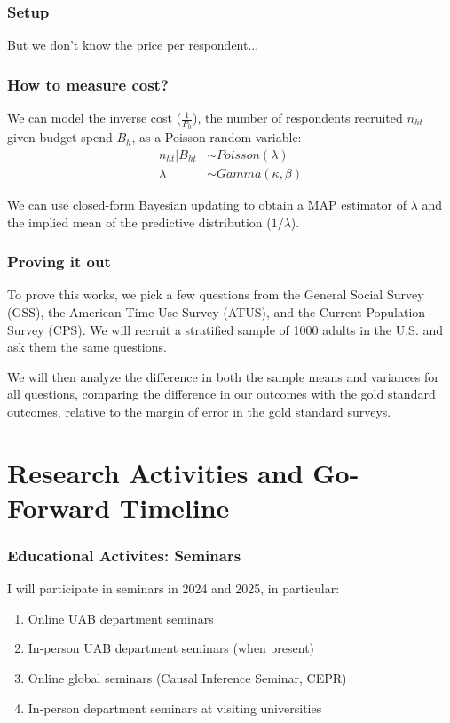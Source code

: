 \documentclass[aspectratio=169]{beamer}
\begin{document}
\begin{frame}
\frametitle{Setup}

But we don't know the price per respondent...

\end{frame}

\begin{frame}
\frametitle{How to measure cost? }

We can model the inverse cost ($\frac{1}{P_h}$), the number of respondents recruited $n_{ht}$ given budget spend $B_h$, as a Poisson random variable:
%
\begin{align*}
n_{ht} | B_{ht} &\sim Poisson(\lambda) \\
\lambda &\sim Gamma(\kappa, \beta)
\end{align*}

We can use closed-form Bayesian updating to obtain a MAP estimator of $\lambda$ and the implied mean of the predictive distribution ($ 1 / \lambda$).

\end{frame} 

\begin{frame}
\frametitle{Proving it out}  

To prove this works, we pick a few questions from the General Social Survey (GSS), the American Time Use Survey (ATUS), and the Current Population Survey (CPS). We will recruit a stratified sample of 1000 adults in the U.S. and ask them the same questions.

We will then analyze the difference in both the sample means and variances for all questions, comparing the difference in our outcomes with the gold standard outcomes, relative to the margin of error in the gold standard surveys. 

\end{frame}


\section{Research Activities and Go-Forward Timeline}

\begin{frame}
  \frametitle{Educational Activites: Seminars}
  
  I will participate in seminars in 2024 and 2025, in particular: 

  \begin{enumerate}
  \item Online UAB department seminars
  \item In-person UAB department seminars (when present)
  \item Online global seminars (Causal Inference Seminar, CEPR)
  \item In-person department seminars at visiting universities
  \end{enumerate}

\end{frame}
\end{document}
